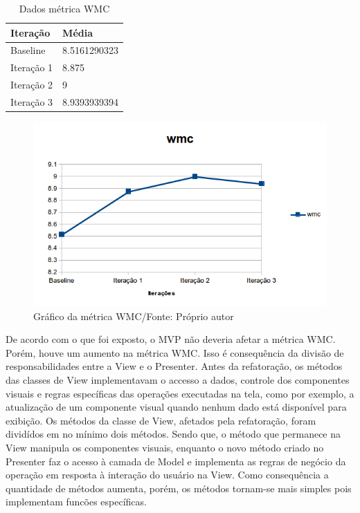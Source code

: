 \begin{table}[!h]
	\centering
	\caption{Dados métrica WMC}
    \begin{tabular}{ | l | l | }
    \hline
    Iteração & Média 			\\ \hline
    Baseline & 8.5161290323   	\\ \hline
    Iteração 1 & 8.875			\\ \hline
	Iteração 2 & 9				\\ \hline
	Iteração 3 & 8.9393939394	\\ \hline
    \end{tabular}
    
    \label{tab:wmc}
\end{table}

\begin{figure}[!h]
	\centering
	\includegraphics{img/wmc.png}
	\caption{Gráfico da métrica WMC/Fonte: Próprio autor} 
	\label{fig:wmc}
\end{figure}


De acordo com o que foi exposto, o MVP não deveria afetar a métrica WMC. Porém,
houve um aumento na métrica WMC. Isso é consequência da divisão de
responsabilidades entre a View e o Presenter. Antes da refatoração, os métodos
das classes de View implementavam o accesso a dados, controle dos componentes
visuais e regras específicas das operações executadas na tela, como por exemplo,
a atualização de um componente visual quando nenhum dado está disponível para
exibição. Os métodos da classe de View, afetados pela refatoração, foram
dividídos em no mínimo dois métodos. Sendo que, o método que permanece na View
manipula os componentes visuais, enquanto o novo método criado no Presenter faz
o acesso à camada de Model e implementa as regras de negócio da operação em
resposta à interação do usuário na View. Como consequência a quantidade de
métodos aumenta, porém, os métodos tornam-se mais simples pois implementam
funcões específicas. 

